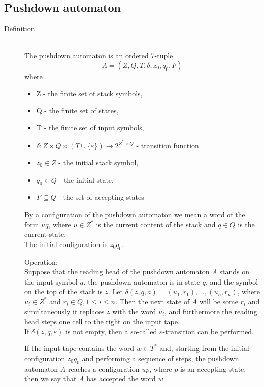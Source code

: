 \documentclass[margin=0px]{article}
\begin{document}
\subsection{Pushdown automaton}
\begin{description}
    \item[Definition] \hfill \\
        The pushdown automaton is an ordered 7-tuple
        \[A = (Z,Q, T, \delta, z_0, q_0, F)\]
        where
        \begin{itemize}
            \item Z - the finite set of stack symbols,
            \item Q - the finite set of states,
            \item T - the finite set of input symbols,
            \item $\delta : Z \times Q \times (T \cup \{\varepsilon\}) \rightarrow 2^{Z^* \times Q}$ - transition function
            \item $z_0 \in Z $ - the initial stack symbol,
            \item $q_0 \in Q $ - the initial state,
            \item $F \subseteq Q$ - the set of accepting states
        \end{itemize}

        By a configuration of the pushdown automaton we mean a word of the form $uq$, where $u \in Z^*$ is the current content of the stack and $q \in Q$ is the current state. \\
        The initial configuration is $z_0q_0$.

        Operation: \\
        Suppose that the reading head of the pushdown automaton $A$ stands on the input symbol $a$, the pushdown automaton is in state $q$, and the symbol on the top of the stack is $z$. Let $ \delta(z, q, a) = {(u_1, r_1), . . . , (u_n, r_n)}$, where $u_i \in Z^*$ and $r_i \in Q, 1 \leq i \leq n$. Then the next state of $A$ will be some $r_i$ and simultaneously it replaces $z$ with the word $u_i$, and furthermore the reading head steps one cell to the right on the input tape.\\
        If $\delta(z, q, \varepsilon)$ is not empty, then a so-called $\varepsilon$-transition can be performed.

        If the input tape contains the word $w \in T^*$ and, starting from the initial configuration $z_0q_0$ and performing a sequence of steps, the pushdown automaton $A$ reaches a configuration $up$, where $p$ is an accepting state, then we say that $A$ has accepted the word $w$.


\end{description}
\end{document}
